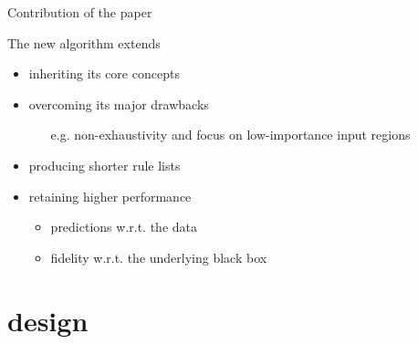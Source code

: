 \documentclass[presentation]{beamer}
\begin{document}
\begin{frame}{Contribution of the paper}

\begin{block}{The new \gridex algorithm extends \iter}
    \begin{itemize}
    	\item inheriting its core concepts
    	\item overcoming its major drawbacks
    	\begin{itemize}
    		\item[e.g.] non-exhaustivity and focus on low-importance input regions
    	\end{itemize}
        \item producing shorter rule lists
        \item retaining higher performance
    	\begin{itemize}
			\item predictions w.r.t. the data
			\item fidelity w.r.t. the underlying black box			
		\end{itemize}        
    \end{itemize}
\end{block}

\end{frame}

\section{\gridex design}
\end{document}
